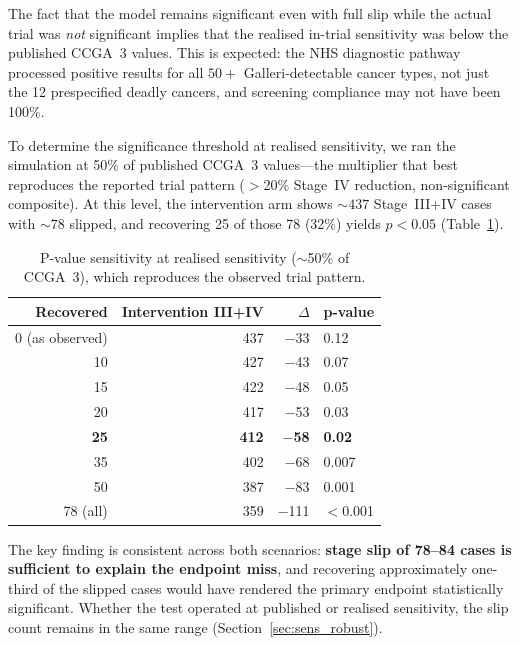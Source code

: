 \documentclass[11pt,letter]{article}
\begin{document}
\noindent The fact that the model remains significant even with full slip
while the actual trial was \emph{not} significant implies that the
realised in-trial sensitivity was below the published CCGA~3 values.
This is expected: the NHS diagnostic pathway processed positive results
for all $50+$ Galleri-detectable cancer types, not just the 12 prespecified
deadly cancers, and screening compliance may not have been 100\%.

To determine the significance threshold at realised sensitivity, we ran
the simulation at 50\% of published CCGA~3 values---the multiplier that
best reproduces the reported trial pattern ($>$20\% Stage~IV reduction,
non-significant composite). At this level, the intervention arm shows
${\sim}437$ Stage~III+IV cases with ${\sim}78$ slipped, and recovering
25 of those 78 (32\%) yields $p < 0.05$ (Table~\ref{tab:pvalue_realised}).

\begin{table}[!ht]\centering
\caption{P-value sensitivity at realised sensitivity (${\sim}$50\% of
CCGA~3), which reproduces the observed trial pattern.}
\label{tab:pvalue_realised}
\begin{tabular}{rrrl}\toprule
Recovered & Intervention III+IV & $\Delta$ & p-value \\ \midrule
0 (as observed)  & 437 & $-$33 & 0.12 \\
10            & 427 & $-$43 & 0.07 \\
15            & 422 & $-$48 & 0.05 \\
20            & 417 & $-$53 & 0.03 \\
\textbf{25}   & \textbf{412} & \textbf{$-$58} & \textbf{0.02} \\
35            & 402 & $-$68 & 0.007 \\
50            & 387 & $-$83 & 0.001 \\
78 (all)      & 359 & $-$111 & $<$0.001 \\
\bottomrule
\end{tabular}
\end{table}

\noindent The key finding is consistent across both scenarios:
\textbf{stage slip of 78--84 cases is sufficient to explain the endpoint
miss}, and recovering approximately one-third of the slipped cases would
have rendered the primary endpoint statistically significant. Whether the
test operated at published or realised sensitivity, the slip count remains
in the same range (Section~\ref{sec:sens_robust}).
\end{document}
